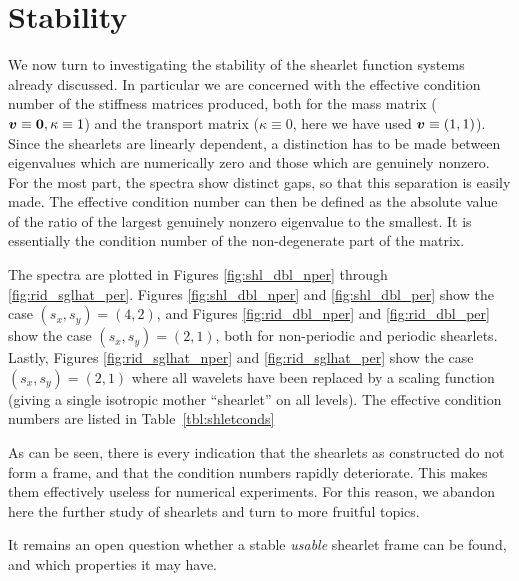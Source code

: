 \section{Stability}

We now turn to investigating the stability of the shearlet function systems already discussed. In particular
we are concerned with the effective condition number of the stiffness matrices produced, both for the mass
matrix (${\bm v}\equiv{\bm0},\kappa\equiv1$) and the transport matrix ($\kappa\equiv0$, here we have used
${\bm v}\equiv(1,1)$). Since the shearlets are linearly dependent, a distinction has to be made between
eigenvalues which are numerically zero and those which are genuinely nonzero. For the most part, the spectra
show distinct gaps, so that this separation is easily made. The effective condition number can then be defined
as the absolute value of the ratio of the largest genuinely nonzero eigenvalue to the smallest. It is
essentially the condition number of the non-degenerate part of the matrix.

The spectra are plotted in Figures \ref{fig:shl_dbl_nper} through \ref{fig:rid_sglhat_per}. Figures
\ref{fig:shl_dbl_nper} and \ref{fig:shl_dbl_per} show the case $(s_x,s_y)=(4,2)$, and Figures
\ref{fig:rid_dbl_nper} and \ref{fig:rid_dbl_per} show the case $(s_x,s_y)=(2,1)$, both for non-periodic and
periodic shearlets. Lastly, Figures \ref{fig:rid_sglhat_nper} and \ref{fig:rid_sglhat_per} show the case
$(s_x,s_y)=(2,1)$ where all wavelets have been replaced by a scaling function (giving a single isotropic
mother ``shearlet'' on all levels). The effective condition numbers are listed in Table~\ref{tbl:shletconds}

As can be seen, there is every indication that the shearlets as constructed do not form a frame, and that the
condition numbers rapidly deteriorate. This makes them effectively useless for numerical experiments. For this
reason, we abandon here the further study of shearlets and turn to more fruitful topics.

It remains an open question whether a stable {\em usable} shearlet frame can be found, and which properties it
may have.

\clearpage

